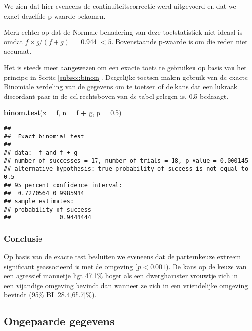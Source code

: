\documentclass[
  12pt,dutch,coursenotes]{book}
\newenvironment{Shaded}{\begin{snugshade}}{\end{snugshade}}
\newcommand{\DataTypeTok}[1]{\textcolor[rgb]{0.13,0.29,0.53}{#1}}
\newcommand{\FloatTok}[1]{\textcolor[rgb]{0.00,0.00,0.81}{#1}}
\newcommand{\KeywordTok}[1]{\textcolor[rgb]{0.13,0.29,0.53}{\textbf{#1}}}
\newcommand{\NormalTok}[1]{#1}
\newcommand{\OperatorTok}[1]{\textcolor[rgb]{0.81,0.36,0.00}{\textbf{#1}}}
\newcommand{\StringTok}[1]{\textcolor[rgb]{0.31,0.60,0.02}{#1}}
\theoremstyle{definition}
\theoremstyle{definition}
\theoremstyle{definition}
\theoremstyle{remark}
\begin{document}
We zien dat hier eveneens de continuïteitscorrectie werd uitgevoerd en dat we exact dezelfde p-waarde bekomen.

Merk echter op dat de Normale benadering van deze toetstatistiek niet ideaal
is omdat \(f \times g/(f+g)=\) 0.944 \(<5\).
Bovenstaande p-waarde is om die reden niet accuraat.

Het is steeds meer aangewezen om een exacte toets te gebruiken op
basis van het principe in Sectie \ref{subsec:binom}.
Dergelijke toetsen maken
gebruik van de exacte Binomiale verdeling van de gegevens om te toetsen of
de kans dat een lukraak discordant paar in de cel rechtsboven van de tabel
gelegen is, 0.5 bedraagt.

\begin{Shaded}
\begin{Highlighting}[]
\KeywordTok{binom.test}\NormalTok{(}\DataTypeTok{x =}\NormalTok{ f, }\DataTypeTok{n =}\NormalTok{ f }\OperatorTok{+}\StringTok{ }\NormalTok{g, }\DataTypeTok{p =} \FloatTok{0.5}\NormalTok{)}
\end{Highlighting}
\end{Shaded}

\begin{verbatim}
## 
##  Exact binomial test
## 
## data:  f and f + g
## number of successes = 17, number of trials = 18, p-value = 0.000145
## alternative hypothesis: true probability of success is not equal to 0.5
## 95 percent confidence interval:
##  0.7270564 0.9985944
## sample estimates:
## probability of success 
##              0.9444444
\end{verbatim}

\hypertarget{conclusie-1}{%
\subsubsection{Conclusie}\label{conclusie-1}}

Op basis van de exacte test besluiten we eveneens dat de parternkeuze extreem significant geassocieerd is met de omgeving (\(p<0.001\)).
De kans op de keuze van een agressief mannetje ligt 47.1\% hoger als een dwerghamster vrouwtje zich in een vijandige omgeving bevindt dan wanneer ze zich in een vriendelijke omgeving bevindt (95\% BI {[}28.4,65.7{]}\%).

\hypertarget{subsec:catOnPaired}{%
\subsection{Ongepaarde gegevens}\label{subsec:catOnPaired}}
\end{document}
